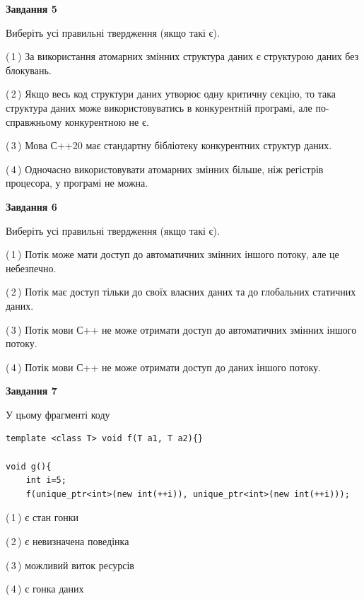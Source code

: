 \documentclass[12pt, ukrainian]{article}
\begin{document}
\begin {large}
{\begin{center}
\textbf{Завдання 5}
\end{center}

Виберіть усі правильні твердження (якщо такі є).\par
\vspace{2mm}

(\,1\,) За використання атомарних змінних структура даних є структурою даних без блокувань.%

(\,2\,) Якщо весь код структури даних утворює одну критичну секцію, то така структура даних може використовуватись в конкурентній програмі, але по-справжньо\-му конкурентною не є.%

(\,3\,) Мова С++20 має стандартну бібліотеку конкурентних структур даних.%

(\,4\,) Одночасно використовувати атомарних змінних більше, ніж регістрів процесора, у програмі не можна.%
\newpage


\begin{center}
\textbf{Завдання 6}
\end{center}

Виберіть усі правильні твердження (якщо такі є).\par
\vspace{2mm}

(\,1\,) Потік може мати доступ до автоматичних змінних іншого потоку, але це небезпечно.%

(\,2\,) Потік має доступ тільки до своїх власних даних та до глобальних статичних даних.%

(\,3\,) Потік мови С++ не може отримати доступ до автоматичних змінних іншого потоку.%

(\,4\,) Потік мови С++ не може отримати доступ до даних іншого потоку.%


\begin{center}
\textbf{Завдання 7}
\end{center}

У цьому фрагменті коду
\begin{verbatim}
template <class T> void f(T a1, T a2){}

void g(){
    int i=5;
    f(unique_ptr<int>(new int(++i)), unique_ptr<int>(new int(++i)));
\end{verbatim}

(\,1\,) є стан гонки%

(\,2\,) є невизначена поведінка%

(\,3\,) можливий виток ресурсів%

(\,4\,) є гонка даних%

}
\end {large}

\vspace{4mm}
\newpage
\end{document}
